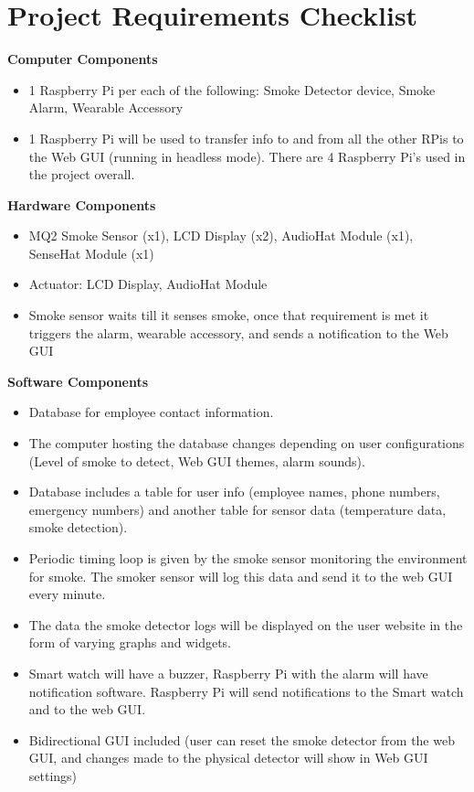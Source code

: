 \section{Project Requirements Checklist}

\textbf{Computer Components}

\begin{itemize}
    \item 1 Raspberry Pi per each of the following: Smoke Detector device, Smoke Alarm, Wearable Accessory
    \item 1 Raspberry Pi will be used to transfer info to and from all the other RPis to the Web GUI (running in headless mode). There are 4 Raspberry Pi’s used in the project overall.
\end{itemize}

\textbf{Hardware Components}

\begin{itemize}
    \item MQ2 Smoke Sensor (x1), LCD Display (x2), AudioHat Module (x1), SenseHat Module (x1)
    \item Actuator: LCD Display, AudioHat Module
    \item Smoke sensor waits till it senses smoke, once that requirement is met it triggers the alarm, wearable accessory, and
          sends a notification to the Web GUI
\end{itemize}

\textbf{Software Components}

\begin{itemize}
    \item Database for employee contact information.
    \item The computer hosting the database changes depending on user configurations (Level of smoke to detect, Web GUI themes,
          alarm sounds).
    \item Database includes a table for user info (employee names, phone numbers, emergency numbers) and another table for sensor
          data (temperature data, smoke detection).
    \item Periodic timing loop is given by the smoke sensor monitoring the environment for smoke. The smoker sensor will log this
          data and send it to the web GUI every minute.
    \item The data the smoke detector logs will be displayed on the user website in the form of varying graphs and widgets.
    \item Smart watch will have a buzzer, Raspberry Pi with the alarm will have notification software. Raspberry Pi will send
          notifications to the Smart watch and to the web GUI.
    \item Bidirectional GUI included (user can reset the smoke detector from the web GUI, and changes made to the physical
          detector will show in Web GUI settings)
\end{itemize}

